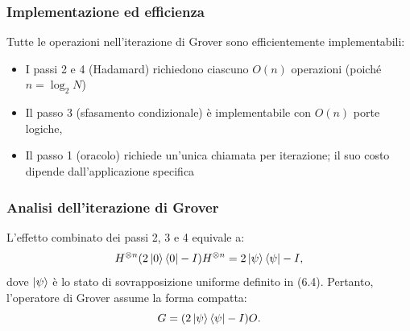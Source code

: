 \documentclass[a4paper,12pt]{report}
\theoremstyle{plain}
\begin{document}
\subsubsection{Implementazione ed efficienza}
Tutte le operazioni nell'iterazione di Grover sono efficientemente implementabili:
\begin{itemize}
    \item I passi 2 e 4 (Hadamard) richiedono ciascuno $O(n)$ operazioni (poiché $n = \log_2 N$)
    \item Il passo 3 (sfasamento condizionale) è implementabile con $O(n)$ porte logiche,
    \item Il passo 1 (oracolo) richiede un'unica chiamata per iterazione; il suo costo dipende dall'applicazione specifica
\end{itemize}
\subsubsection{Analisi dell'iterazione di Grover}
L'effetto combinato dei passi 2, 3 e 4 equivale a:
\begin{equation}
H^{\otimes n} (2\ket{0}\bra{0} - I) H^{\otimes n} = 2\ket{\psi}\bra{\psi} - I,
\end{equation}
dove $\ket{\psi}$ è lo stato di sovrapposizione uniforme definito in (6.4). Pertanto, l'operatore di Grover assume la forma compatta:
\begin{equation}
G = (2\ket{\psi}\bra{\psi} - I)O.
\end{equation}
\end{document}
